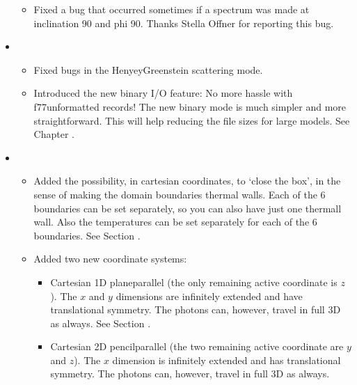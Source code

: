 \documentclass[letterpaper,10pt,english]{sphinxmanual}
\begin{document}
\begin{itemize}
\begin{itemize}
\item {} 
Fixed a bug that occurred sometimes if a spectrum was made at
inclination 90 and phi 90. Thanks Stella Offner for reporting this bug.

\end{itemize}

\item {} 
\begin{itemize}
\item {} 
Fixed bugs in the Henyey\sphinxhyphen{}Greenstein scattering mode.

\item {} 
Introduced the new binary I/O feature: No more hassle with
f77\sphinxhyphen{}unformatted records! The new binary mode is much simpler and more
straightforward. This will help reducing the file sizes for large models.
See Chapter {\hyperref[\detokenize{binaryio:chap-binary-io}]{}}.

\end{itemize}

\item {} 
\begin{itemize}
\item {} 
Added the possibility, in cartesian coordinates, to ‘close the
box’, in the sense of making the domain boundaries thermal walls.
Each of the 6 boundaries can be set separately, so you can also have
just one thermall wall. Also the temperatures can be set separately
for each of the 6 boundaries. See Section {\hyperref[\detokenize{gridding:sec-thermal-boundaries}]{}}.

\item {} 
Added two new coordinate systems:
\begin{itemize}
\item {} 
Cartesian 1\sphinxhyphen{}D plane\sphinxhyphen{}parallel (the only remaining active coordinate
is \(z\)). The \(x\) and \(y\) dimensions are infinitely extended and
have translational symmetry. The photons can, however, travel in
full 3\sphinxhyphen{}D as always. See Section {\hyperref[\detokenize{gridding:sec-1d-plane-parallel}]{}}.

\item {} 
Cartesian 2\sphinxhyphen{}D pencil\sphinxhyphen{}parallel (the two remaining active coordinate
are \(y\) and \(z\)). The \(x\) dimension is infinitely extended and
has translational symmetry. The photons can, however, travel in
full 3\sphinxhyphen{}D as always.


\end{itemize}
\end{itemize}
\end{itemize}
\end{document}
